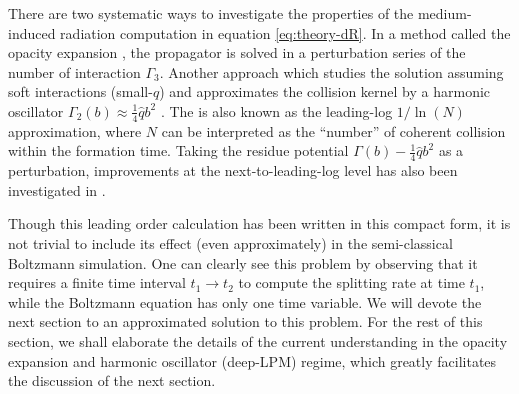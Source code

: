 There are two systematic ways to investigate the properties of the medium-induced radiation computation in equation \ref{eq:theory-dR}.
In a method called the opacity expansion \cite{Wiedemann:2000za,Gyulassy:1999zd}, the propagator is solved in a perturbation series of the number of interaction $\Gamma_3$. 
Another approach which studies the solution assuming soft interactions (small-$q$) and approximates the collision kernel by a harmonic oscillator  $\Gamma_2(b) \approx \frac{1}{4}\hat{q}b^2$ \cite{Baier:1996kr,Baier:1998yf,Baier:1996sk}.
The is also known as the leading-log $1/\ln(N)$ approximation, where $N$ can be interpreted as the ``number'' of coherent collision within the formation time.
Taking the residue potential $\Gamma(b) - \frac{1}{4}\hat{q}b^2$ as a perturbation, improvements at the next-to-leading-log level has also been investigated in \cite{Arnold:2008zu,Mehtar-Tani:2019tvy}.

Though this leading order calculation has been written in this compact form, it is not trivial to include its effect (even approximately) in the semi-classical Boltzmann simulation.
One can clearly see this problem by observing that it requires a finite time interval $t_1 \rightarrow t_2$ to compute the splitting rate at time $t_1$, while the Boltzmann equation has only one time variable. 
We will devote the next section to an approximated solution to this problem.
For the rest of this section, we shall elaborate the details of the current understanding in the opacity expansion and harmonic oscillator (deep-LPM) regime, which greatly facilitates the discussion of the next section.

